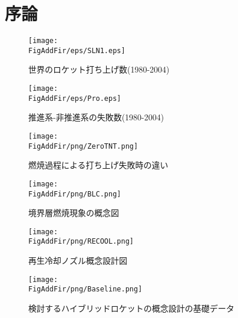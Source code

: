 \chapter{序論}
\newcommand{\FigAddFir}{./src/Chapter1/Figure}


%

\begin{figure}
\centering
\texttt{[image: \\FigAddFir/eps/SLN1.eps]}
\caption{世界のロケット打ち上げ数(1980-2004)}
\label{fig:Success/Failure}
\end{figure}
\begin{figure}
\centering
\texttt{[image: \\FigAddFir/eps/Pro.eps]}
\caption{推進系-非推進系の失敗数(1980-2004)}
\label{fig:ProFail}
\end{figure}
\begin{figure}
\centering
\texttt{[image: \\FigAddFir/png/ZeroTNT.png]}
\caption{燃焼過程による打ち上げ失敗時の違い}
\label{fig:DiffExplo}
\end{figure}
\begin{figure}
\centering
\texttt{[image: \\FigAddFir/png/BLC.png]}
\caption{境界層燃焼現象の概念図}
\label{fig:BLC}
\end{figure}
\begin{figure}
\centering
\texttt{[image: \\FigAddFir/png/RECOOL.png]}
\caption{再生冷却ノズル概念設計図}
\label{fig:ReCool}
\end{figure}
\begin{figure}
\centering
\texttt{[image: \\FigAddFir/png/Baseline.png]}
\caption{検討するハイブリッドロケットの概念設計の基礎データ}
\label{fig:Baseline}
\end{figure}
